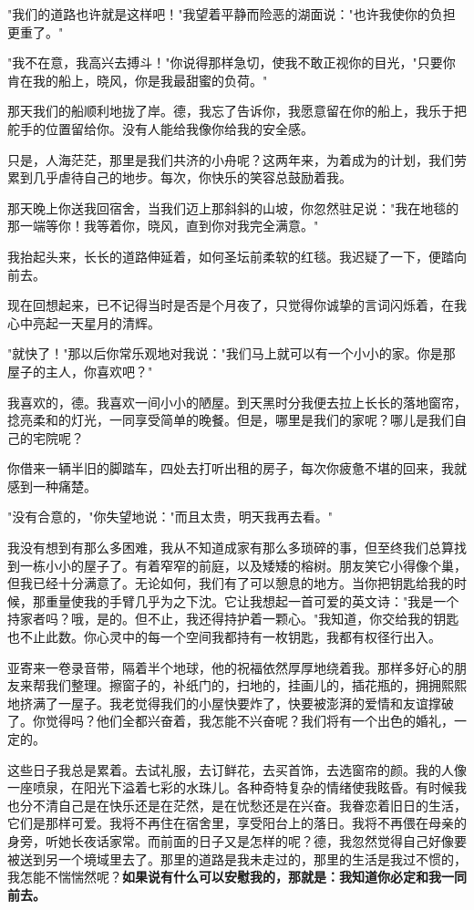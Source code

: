 \documentclass[UTF8,a4paper,8pt]{ctexbook}
\begin{document}
		"我们的道路也许就是这样吧！"我望着平静而险恶的湖面说："也许我使你的负担更重了。"
		
		"我不在意，我高兴去搏斗！"你说得那样急切，使我不敢正视你的目光，"只要你肯在我的船上，晓风，你是我最甜蜜的负荷。"
		
		那天我们的船顺利地拢了岸。德，我忘了告诉你，我愿意留在你的船上，我乐于把舵手的位置留给你。没有人能给我像你给我的安全感。
		
		只是，人海茫茫，那里是我们共济的小舟呢？这两年来，为着成为的计划，我们劳累到几乎虐待自己的地步。每次，你快乐的笑容总鼓励着我。
		
		那天晚上你送我回宿舍，当我们迈上那斜斜的山坡，你忽然驻足说："我在地毯的那一端等你！我等着你，晓风，直到你对我完全满意。"
		
		我抬起头来，长长的道路伸延着，如何圣坛前柔软的红毯。我迟疑了一下，便踏向前去。
		
		现在回想起来，已不记得当时是否是个月夜了，只觉得你诚挚的言词闪烁着，在我心中亮起一天星月的清辉。
		
		"就快了！"那以后你常乐观地对我说："我们马上就可以有一个小小的家。你是那屋子的主人，你喜欢吧？"
		
		我喜欢的，德。我喜欢一间小小的陋屋。到天黑时分我便去拉上长长的落地窗帘，捻亮柔和的灯光，一同享受简单的晚餐。但是，哪里是我们的家呢？哪儿是我们自己的宅院呢？
		
		你借来一辆半旧的脚踏车，四处去打听出租的房子，每次你疲惫不堪的回来，我就感到一种痛楚。
		
		"没有合意的，"你失望地说："而且太贵，明天我再去看。"
		
		我没有想到有那么多困难，我从不知道成家有那么多琐碎的事，但至终我们总算找到一栋小小的屋子了。有着窄窄的前庭，以及矮矮的榕树。朋友笑它小得像个巢，但我已经十分满意了。无论如何，我们有了可以憩息的地方。当你把钥匙给我的时候，那重量使我的手臂几乎为之下沈。它让我想起一首可爱的英文诗："我是一个持家者吗？哦，是的。但不止，我还得持护着一颗心。"我知道，你交给我的钥匙也不止此数。你心灵中的每一个空间我都持有一枚钥匙，我都有权径行出入。
		
		亚寄来一卷录音带，隔着半个地球，他的祝福依然厚厚地绕着我。那样多好心的朋友来帮我们整理。擦窗子的，补纸门的，扫地的，挂画儿的，插花瓶的，拥拥熙熙地挤满了一屋子。我老觉得我们的小屋快要炸了，快要被澎湃的爱情和友谊撑破了。你觉得吗？他们全都兴奋着，我怎能不兴奋呢？我们将有一个出色的婚礼，一定的。
		
		这些日子我总是累着。去试礼服，去订鲜花，去买首饰，去选窗帘的颜。我的人像一座喷泉，在阳光下溢着七彩的水珠儿。各种奇特复杂的情绪使我眩昏。有时候我也分不清自己是在快乐还是在茫然，是在忧愁还是在兴奋。我眷恋着旧日的生活，它们是那样可爱。我将不再住在宿舍里，享受阳台上的落日。我将不再偎在母亲的身旁，听她长夜话家常。而前面的日子又是怎样的呢？德，我忽然觉得自己好像要被送到另一个境域里去了。那里的道路是我未走过的，那里的生活是我过不惯的，我怎能不惴惴然呢？\textbf{如果说有什么可以安慰我的，那就是：我知道你必定和我一同前去。}
		
\end{document}
